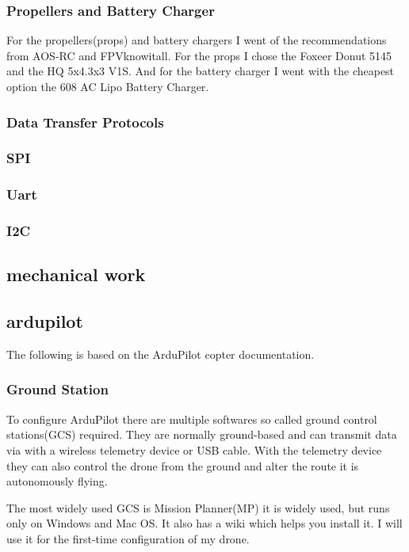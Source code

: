 \documentclass{article}
\begin{document}
	\subsubsection{Propellers and Battery Charger}
	For the propellers(props) and battery chargers I went of the recommendations from AOS-RC and FPVknowitall. For the props I chose the Foxeer Donut 5145\cite{toroidal} and the HQ 5x4.3x3 V1S\cite{hqprops}. And for the battery charger I went with the cheapest option the 608 AC Lipo Battery Charger\cite{lipocharger}.

\subsubsection{Data Transfer Protocols}
	\subsubsection*{SPI}
	\subsubsection*{Uart}
	\subsubsection*{I2C}
	
	
	
	
	\subsection{mechanical work}
	
	\subsection{ardupilot}
	The following is based on the ArduPilot copter documentation\cite{ardupilotdocs}.
	\subsubsection{Ground Station}
	To configure ArduPilot there are multiple softwares so called ground control stations(GCS) required. They are normally ground-based and can transmit data via with a wireless telemetry device or USB cable.  With the telemetry device they can also control the drone from the ground and alter the route it is autonomously flying. 
	
	The most widely used GCS is Mission Planner(MP)\cite{MissionPlanner} it is widely used, but runs only on Windows and Mac OS. It also has a wiki which helps you install it. I will use it for the first-time configuration of my drone. 
	
\end{document}
